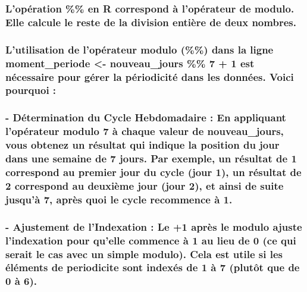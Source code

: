 \documentclass[
]{article}
\begin{document}
\subsubsection{L'opération \%\% en R correspond à l'opérateur de modulo.
Elle calcule le reste de la division entière de deux
nombres.}\label{lopuxe9ration-en-r-correspond-uxe0-lopuxe9rateur-de-modulo.-elle-calcule-le-reste-de-la-division-entiuxe8re-de-deux-nombres.}

\subsubsection{L'utilisation de l'opérateur modulo (\%\%) dans la ligne
moment\_periode \textless- nouveau\_jours \%\% 7 + 1 est nécessaire pour
gérer la périodicité dans les données. Voici pourquoi
:}\label{lutilisation-de-lopuxe9rateur-modulo-dans-la-ligne-moment_periode---nouveau_jours-7-1-est-nuxe9cessaire-pour-guxe9rer-la-puxe9riodicituxe9-dans-les-donnuxe9es.-voici-pourquoi}

\subsubsection{- Détermination du Cycle Hebdomadaire : En appliquant
l'opérateur modulo 7 à chaque valeur de nouveau\_jours, vous obtenez un
résultat qui indique la position du jour dans une semaine de 7 jours.
Par exemple, un résultat de 1 correspond au premier jour du cycle (jour
1), un résultat de 2 correspond au deuxième jour (jour 2), et ainsi de
suite jusqu'à 7, après quoi le cycle recommence à
1.}\label{duxe9termination-du-cycle-hebdomadaire-en-appliquant-lopuxe9rateur-modulo-7-uxe0-chaque-valeur-de-nouveau_jours-vous-obtenez-un-ruxe9sultat-qui-indique-la-position-du-jour-dans-une-semaine-de-7-jours.-par-exemple-un-ruxe9sultat-de-1-correspond-au-premier-jour-du-cycle-jour-1-un-ruxe9sultat-de-2-correspond-au-deuxiuxe8me-jour-jour-2-et-ainsi-de-suite-jusquuxe0-7-apruxe8s-quoi-le-cycle-recommence-uxe0-1.}

\subsubsection{- Ajustement de l'Indexation : Le +1 après le modulo
ajuste l'indexation pour qu'elle commence à 1 au lieu de 0 (ce qui
serait le cas avec un simple modulo). Cela est utile si les éléments de
periodicite sont indexés de 1 à 7 (plutôt que de 0 à
6).}\label{ajustement-de-lindexation-le-1-apruxe8s-le-modulo-ajuste-lindexation-pour-quelle-commence-uxe0-1-au-lieu-de-0-ce-qui-serait-le-cas-avec-un-simple-modulo.-cela-est-utile-si-les-uxe9luxe9ments-de-periodicite-sont-indexuxe9s-de-1-uxe0-7-plutuxf4t-que-de-0-uxe0-6.}
\end{document}

